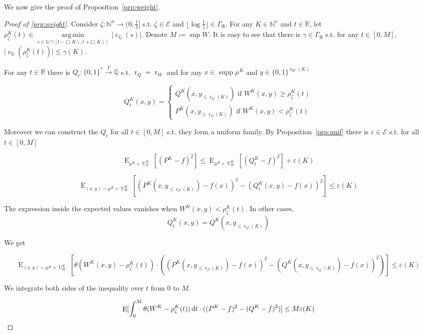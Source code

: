 \documentclass{article}
\numberwithin{equation}{section}
\theoremstyle{definition}
\theoremstyle{plain}
\newcommand{\Bool}{\{0,1\}}
\newcommand{\Words}{{\Bool^*}}
\newcommand{\WordsLen}[1]{{\Bool^{#1}}}
\DeclareMathOperator{\Supp}{supp}
\DeclareMathOperator{\E}{E}
\DeclareMathOperator{\R}{r}
\DeclareMathOperator{\Un}{U}
\DeclareMathOperator{\En}{c}
\newcommand{\Argmin}[1]{\underset{#1}{\operatorname{arg\,min}}\,}
\newcommand{\Nats}{\mathbb{N}}
\newcommand{\Rats}{\mathbb{Q}}
\newcommand{\Reals}{\mathbb{R}}
\newcommand{\Abs}[1]{\lvert #1 \rvert}
\newcommand{\Floor}[1]{\lfloor #1 \rfloor}
\newcommand{\GrowA}{\Gamma_{\mathfrak{A}}}
\newcommand{\Fall}{\mathcal{E}}
\newcommand{\Scheme}{\xrightarrow{\Gamma}}
\begin{document}
We now give the proof of Proposition~\ref{prp:weight}.

\begin{proof}[Proof of \ref{prp:weight}]

Consider $\zeta: \Nats^n \rightarrow (0,\frac{1}{2}]$ s.t.  $\zeta \in \Fall$ and $\Floor{\log \frac{1}{\zeta}} \in \GrowA$. For any $K \in \Nats^n$ and $t \in \Reals$, let $\rho_\zeta^{K}(t) \in \Argmin{s \in \Rats \cap [t-\zeta(K),t+\zeta(K)]} \Abs{\En_\Rats(s)}$. Denote $M:= \sup W$. It is easy to see that there is $\gamma \in \GrowA$ s.t. for any $t \in [0, M]$, ${\Abs{\En_\Rats(\rho_\zeta^{K}(t))} \leq \gamma(K)}$.

For any $t \in \Reals$ there is $Q_t: \Words \Scheme \Rats$ s.t. $\R_Q=\R_W$ and for any ${x \in \Supp \mu^{K}}$ and ${y \in \WordsLen{\R_W(K)}}$

$$Q_t^{K}(x,y)=\begin{cases}Q^{K}(x,y_{\leq \R_Q(K)}) \text{ if } W^{K}(x,y) \geq \rho^{K}_\zeta(t) \\ P^{K}(x,y_{\leq \R_P(K)}) \text{ if } W^{K}(x,y) < \rho^{K}_\zeta(t)\end{cases}$$

Moreover we can construct the $Q_t$ for all $t \in [0, M]$ s.t. they form a uniform family. By Proposition~\ref{prp:unif} there is $\varepsilon \in \Fall$ s.t. for all $t \in [0, M]$

$$\E_{\mu^{K} \times \Un_P^{K}}[(P^{K}-f)^2] \leq \E_{\mu^{K} \times \Un_W^{K}}[(Q_t^{K}-f)^2] + \varepsilon(K)$$

$$\E_{(x,y) \sim \mu^{K} \times \Un_W^{K}}[(P^{K}(x,y_{\leq \R_P(K)})-f(x))^2-(Q_t^{K}(x,y)-f(x))^2] \leq \varepsilon(K)$$

The expression inside the expected values vanishes when $W^{K}(x,y) < \rho^{K}_\zeta(t)$. In other cases, 
\[Q_t^{K}(x,y) = Q^{K}(x,y_{\leq \R_Q(K)})\]

We get

$$\E_{(x,y) \sim \mu^{K} \times \Un_W^{K}}[\theta(W^{K}(x,y)-\rho_\zeta^{K}(t)) \cdot ((P^{K}(x,y_{\leq \R_P(K)})-f(x))^2-(Q^{K}(x,y_{\leq \R_Q(K)})-f(x))^2)] \leq \varepsilon(K)$$

We integrate both sides of the inequality over $t$ from 0 to $M$.

\begin{equation}
\label{eqn:prp__weight__prf1}
\E[\int_0^M\theta(W^{K}-\rho_\zeta^{K}(t)) \dif t \cdot ((P^{K}-f)^2-(Q^{K}-f)^2)] \leq M \varepsilon(K)
\end{equation}


\end{proof}
\end{document}
